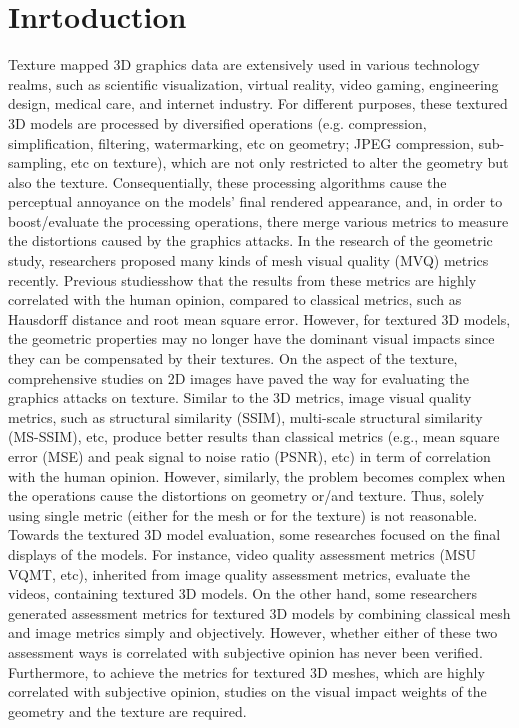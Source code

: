\section{Inrtoduction}
Texture mapped 3D graphics data are extensively used in various technology realms, such as scientific visualization, virtual reality, video gaming, engineering design, medical care, and internet industry. For different purposes, these textured 3D models are processed by diversified operations (e.g. compression, simplification, filtering, watermarking, etc on geometry; JPEG compression, sub-sampling, etc on texture), which are not only restricted to alter the geometry but also the texture. Consequentially, these processing algorithms cause the perceptual annoyance on the models’ final rendered appearance, and, in order to boost/evaluate the processing operations, there merge various metrics to measure the distortions caused by the graphics attacks. In the research of the geometric study, researchers\cite{Lavou__2011}\cite{V_a_2012}\cite{Wang_2011} proposed many kinds of mesh visual quality (MVQ) metrics recently. Previous studies\cite{Corsini_2013}\cite{Guo_2015}show that the results from these metrics are highly correlated with the human opinion, compared to classical metrics, such as Hausdorff distance and root mean square error. However, for textured 3D models, the geometric properties may no longer have the dominant visual impacts since they can be compensated by their textures.  On the aspect of the texture, comprehensive studies on 2D images have paved the way for evaluating the graphics attacks on texture.  Similar to the 3D metrics, image visual quality metrics, such as structural similarity (SSIM)\cite{Wang_2004}, multi-scale structural similarity (MS-SSIM)\cite{Zhou_Wang_2011}, etc, produce better results than classical metrics (e.g., mean square error (MSE) and peak signal to noise ratio (PSNR), etc) in term of correlation with the human opinion. However, similarly, the problem becomes complex when the operations cause the distortions on geometry or/and texture. Thus, solely using single metric (either for the mesh or for the texture) is not reasonable. Towards the textured 3D model evaluation, some researches focused on the final displays of the models. For instance, video quality assessment metrics (MSU VQMT, etc), inherited from image quality assessment metrics\cite{Wang_2006}, evaluate the videos, containing textured 3D models.  On the other hand, some researchers\cite{Tian_2004} generated assessment metrics for textured 3D models by combining classical mesh and image metrics simply and objectively. However, whether either of these two assessment ways is correlated with subjective opinion has never been verified. Furthermore, to achieve the metrics for textured 3D meshes, which are highly correlated with subjective opinion, studies on the visual impact weights of the geometry and the texture are required.